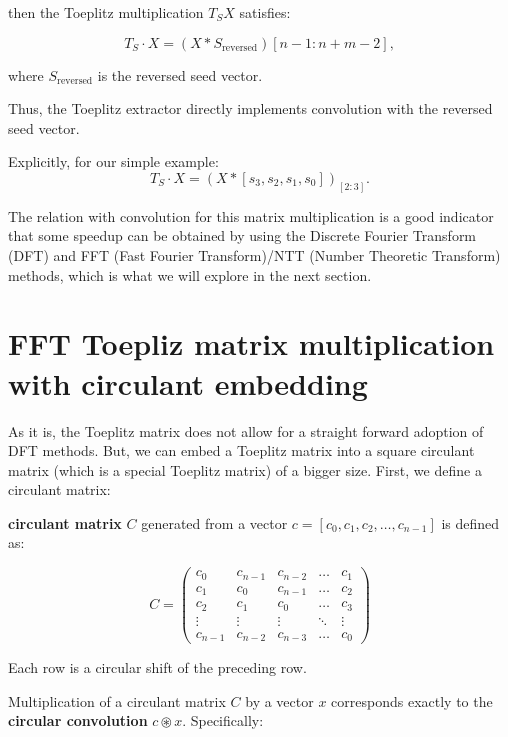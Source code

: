 \begin{example}
	then the Toeplitz multiplication \( T_S X \) satisfies:

	\[
	T_S \cdot X = (X * S_{\text{reversed}})[n-1 : n+m-2],
	\]

	where \( S_{\text{reversed}} \) is the reversed seed vector.

	Thus, the Toeplitz extractor directly implements convolution with the reversed seed vector.

	\vspace{0.5em}

	Explicitly, for our simple example:
	\[
	T_S \cdot X = (X * [s_3, s_2, s_1, s_0])_{[2:3]}.
	\]
\end{example}

The relation with convolution for this matrix multiplication is a good indicator that some speedup can be obtained by using the Discrete Fourier Transform (DFT) and FFT (Fast Fourier Transform)/NTT (Number Theoretic Transform) methods, which is what we will explore in the next section.

\section{FFT Toepliz matrix multiplication with circulant embedding}

As it is, the Toeplitz matrix does not allow for a straight forward adoption of DFT methods. But, we can embed a Toeplitz matrix into a square circulant matrix (which is a special Toeplitz matrix) of a bigger size. First, we define a circulant matrix:

\begin{definition}
	
	\textbf{circulant matrix} \(C\) generated from a vector \( c = [c_0, c_1, c_2, \dots, c_{n-1}] \) is defined as:

	\[
		C = \begin{pmatrix}
			c_0 & c_{n-1} & c_{n-2} & \dots & c_1 \\
			c_1 & c_0 & c_{n-1} & \dots & c_2 \\
			c_2 & c_1 & c_0 & \dots & c_3 \\
			\vdots & \vdots & \vdots & \ddots & \vdots \\
			c_{n-1} & c_{n-2} & c_{n-3} & \dots & c_0
		\end{pmatrix}
	\]

Each row is a circular shift of the preceding row.
\end{definition}


Multiplication of a circulant matrix \(C\) by a vector \(x\) corresponds exactly to the \textbf{circular convolution} \( c \circledast x \). Specifically:

